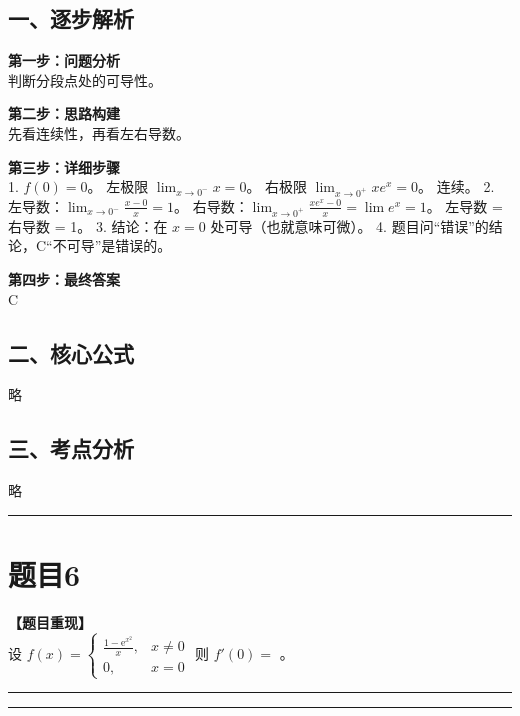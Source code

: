 \documentclass[12pt, a4paper]{ctexart}
\newcommand{\TopSeparator}{
    \par\noindent\rule{\textwidth}{1.5pt}\vspace{0.5em} %
}
\newcommand{\AnalysisSeparator}{
    \par\noindent\rule{\textwidth}{0.5pt}\vspace{0.2em}\hrule\vspace{0.5em} %
}
\newenvironment{RedAnalysis}{
    \par
    \color{red} %
}{
    \par
    \color{black} %
}
\begin{document}
\begin{RedAnalysis}

\subsection*{一、逐步解析}

\textbf{第一步：问题分析} \\
判断分段点处的可导性。

\textbf{第二步：思路构建} \\
先看连续性，再看左右导数。

\textbf{第三步：详细步骤} \\
1. $f(0)=0$。
   左极限 $\lim_{x\to 0^-} x = 0$。
   右极限 $\lim_{x\to 0^+} xe^x = 0$。
   连续。
2. 左导数：$\lim_{x\to 0^-} \frac{x-0}{x} = 1$。
   右导数：$\lim_{x\to 0^+} \frac{xe^x-0}{x} = \lim e^x = 1$。
   左导数 = 右导数 = 1。
3. 结论：在 $x=0$ 处可导（也就意味可微）。
4. 题目问“错误”的结论，C“不可导”是错误的。

\textbf{第四步：最终答案} \\
C

\subsection*{二、核心公式}
略

\subsection*{三、考点分析}
略

\end{RedAnalysis}

\vspace{2em}

\TopSeparator
\section*{题目6}

\textbf{【题目重现】} \\
设 $ f(x)=\begin{cases}\frac{1-\mathrm{e}^{x^{2}}}{x}, & x \neq 0 \\ 0, & x = 0\end{cases} $ 则 $ f'(0)= $ \underline{\hspace{2cm}}。

\AnalysisSeparator
\end{document}
